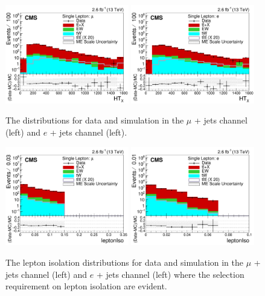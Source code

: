 \begin{figure}[ht!]
    \includegraphics[width=0.48\textwidth]{images/Run2/HTX_StackLogY.pdf}
    \includegraphics[width=0.48\textwidth]{images/Run2/HTX_StackLogY_e.pdf}
    \caption{The \HTX distributions for data and simulation in the $\mu$ + jets channel (left) and $e$ + jets channel (left).}
    \label{fig:HTX}
\end{figure} 

\begin{figure}
    \includegraphics[width=0.48\textwidth]{images/Run2/leptonIso_StackLogY.pdf}
    \includegraphics[width=0.48\textwidth]{images/Run2/leptonIso_StackLogY_e.pdf}
    \caption{The lepton isolation distributions for data and simulation in the $\mu$ + jets channel (left) and $e$ + jets channel (left) where the selection requirement on lepton isolation are evident.}
    \label{fig:lepiso}
\end{figure}
\pagebreak

